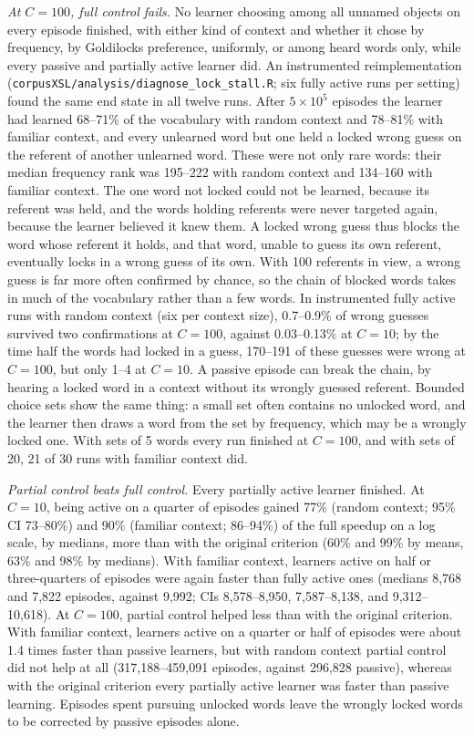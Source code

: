 \documentclass[11pt]{article}
\begin{document}
\textit{At $C=100$, full control fails.} No learner choosing among all unnamed objects on every episode finished, with either kind of context and whether it chose by frequency, by Goldilocks preference, uniformly, or among heard words only, while every passive and partially active learner did. An instrumented reimplementation (\texttt{corpusXSL/analysis/diagnose\_lock\_stall.R}; six fully active runs per setting) found the same end state in all twelve runs. After $5 \times 10^5$ episodes the learner had learned 68--71\% of the vocabulary with random context and 78--81\% with familiar context, and every unlearned word but one held a locked wrong guess on the referent of another unlearned word. These were not only rare words: their median frequency rank was 195--222 with random context and 134--160 with familiar context. The one word not locked could not be learned, because its referent was held, and the words holding referents were never targeted again, because the learner believed it knew them. A locked wrong guess thus blocks the word whose referent it holds, and that word, unable to guess its own referent, eventually locks in a wrong guess of its own. With 100 referents in view, a wrong guess is far more often confirmed by chance, so the chain of blocked words takes in much of the vocabulary rather than a few words. In instrumented fully active runs with random context (six per context size), 0.7--0.9\% of wrong guesses survived two confirmations at $C=100$, against 0.03--0.13\% at $C=10$; by the time half the words had locked in a guess, 170--191 of these guesses were wrong at $C=100$, but only 1--4 at $C=10$. A passive episode can break the chain, by hearing a locked word in a context without its wrongly guessed referent. Bounded choice sets show the same thing: a small set often contains no unlocked word, and the learner then draws a word from the set by frequency, which may be a wrongly locked one. With sets of 5 words every run finished at $C=100$, and with sets of 20, 21 of 30 runs with familiar context did.

\textit{Partial control beats full control.} Every partially active learner finished. At $C=10$, being active on a quarter of episodes gained 77\% (random context; 95\% CI 73--80\%) and 90\% (familiar context; 86--94\%) of the full speedup on a log scale, by medians, more than with the original criterion (60\% and 99\% by means, 63\% and 98\% by medians). With familiar context, learners active on half or three-quarters of episodes were again faster than fully active ones (medians 8,768 and 7,822 episodes, against 9,992; CIs 8,578--8,950, 7,587--8,138, and 9,312--10,618). At $C=100$, partial control helped less than with the original criterion. With familiar context, learners active on a quarter or half of episodes were about 1.4 times faster than passive learners, but with random context partial control did not help at all (317,188--459,091 episodes, against 296,828 passive), whereas with the original criterion every partially active learner was faster than passive learning. Episodes spent pursuing unlocked words leave the wrongly locked words to be corrected by passive episodes alone.
\end{document}
